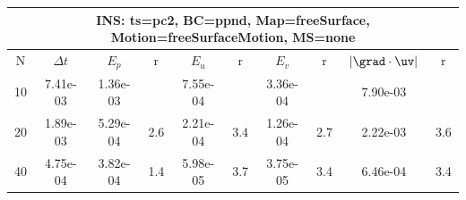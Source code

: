 
\begin{tabular}{|c|c|c|c|c|c|c|c|c|c|} \hline
 \multicolumn{10}{|c|}{INS: ts=pc2, BC=ppnd, Map=freeSurface, Motion=freeSurfaceMotion, MS=none } \\ \hline 
     N  &   $\Delta t$ & $E_p$   &  r  &   $E_u$   &   r    &   $E_v$   & r   &  $|\grad\cdot\uv|$  & r   \\ \hline 
  10   &  7.41e-03  &   1.36e-03  &        &   7.55e-04  &        &   3.36e-04  &        &   7.90e-03  &        \\ 
  20   &  1.89e-03  &   5.29e-04  & 2.6  &   2.21e-04  & 3.4  &   1.26e-04  & 2.7  &   2.22e-03  & 3.6  \\ 
  40   &  4.75e-04  &   3.82e-04  & 1.4  &   5.98e-05  & 3.7  &   3.75e-05  & 3.4  &   6.46e-04  & 3.4  \\ 
 \hline 
\end{tabular}
